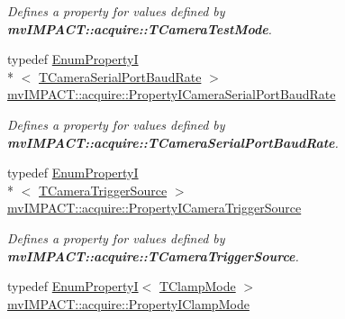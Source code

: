 \begin{DoxyCompactItemize}
\begin{DoxyCompactList}\small\item\em Defines a property for values defined by {\bfseries mv\+I\+M\+P\+A\+C\+T\+::acquire\+::\+T\+Camera\+Test\+Mode}. \end{DoxyCompactList}\item 
\hypertarget{group___device_specific_interface_ga74bf9929c27fa7d47798e130fa005e6a}{typedef \hyperlink{classmv_i_m_p_a_c_t_1_1acquire_1_1_enum_property_i}{Enum\+Property\+I}\\*
$<$ \hyperlink{group___device_specific_interface_ga6b592e04a4f1db924eba76ff6cad77dc}{T\+Camera\+Serial\+Port\+Baud\+Rate} $>$ \hyperlink{group___device_specific_interface_ga74bf9929c27fa7d47798e130fa005e6a}{mv\+I\+M\+P\+A\+C\+T\+::acquire\+::\+Property\+I\+Camera\+Serial\+Port\+Baud\+Rate}}\label{group___device_specific_interface_ga74bf9929c27fa7d47798e130fa005e6a}

\begin{DoxyCompactList}\small\item\em Defines a property for values defined by {\bfseries mv\+I\+M\+P\+A\+C\+T\+::acquire\+::\+T\+Camera\+Serial\+Port\+Baud\+Rate}. \end{DoxyCompactList}\item 
\hypertarget{group___device_specific_interface_ga40354af1fd85b454ec1b4e5ca007755d}{typedef \hyperlink{classmv_i_m_p_a_c_t_1_1acquire_1_1_enum_property_i}{Enum\+Property\+I}\\*
$<$ \hyperlink{group___device_specific_interface_ga18243d80e95a98e9596ed83ed96cdb54}{T\+Camera\+Trigger\+Source} $>$ \hyperlink{group___device_specific_interface_ga40354af1fd85b454ec1b4e5ca007755d}{mv\+I\+M\+P\+A\+C\+T\+::acquire\+::\+Property\+I\+Camera\+Trigger\+Source}}\label{group___device_specific_interface_ga40354af1fd85b454ec1b4e5ca007755d}

\begin{DoxyCompactList}\small\item\em Defines a property for values defined by {\bfseries mv\+I\+M\+P\+A\+C\+T\+::acquire\+::\+T\+Camera\+Trigger\+Source}. \end{DoxyCompactList}\item 
\hypertarget{group___device_specific_interface_ga44f306409b1d737b2eea3f66767e2c23}{typedef \hyperlink{classmv_i_m_p_a_c_t_1_1acquire_1_1_enum_property_i}{Enum\+Property\+I}$<$ \hyperlink{group___device_specific_interface_gad42717c53ece3c90f468265fd0267ad2}{T\+Clamp\+Mode} $>$ \hyperlink{group___device_specific_interface_ga44f306409b1d737b2eea3f66767e2c23}{mv\+I\+M\+P\+A\+C\+T\+::acquire\+::\+Property\+I\+Clamp\+Mode}}\label{group___device_specific_interface_ga44f306409b1d737b2eea3f66767e2c23}


\end{DoxyCompactItemize}
